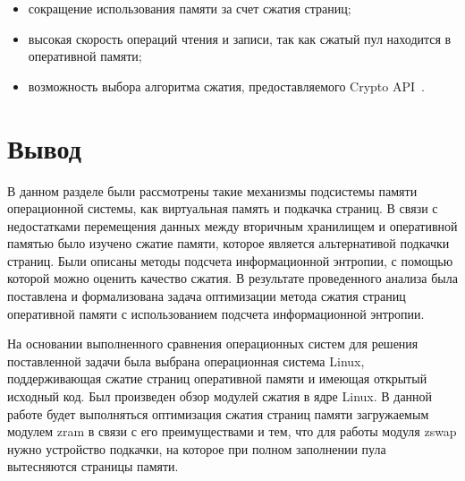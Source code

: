 \begin{itemize}
	\item сокращение использования памяти за счет сжатия страниц;
	\item высокая скорость операций чтения и записи, так как сжатый пул находится в оперативной памяти;
    \item возможность выбора алгоритма сжатия, предоставляемого Crypto API~\cite{crypto}.
\end{itemize}

\section*{Вывод}

В данном разделе были рассмотрены такие механизмы подсистемы памяти операционной системы, как виртуальная память и подкачка страниц. В связи с недостатками перемещения данных между вторичным хранилищем и оперативной памятью было изучено сжатие памяти, которое является альтернативой подкачки страниц. Были описаны методы подсчета информационной энтропии, с помощью которой можно оценить качество сжатия. В результате проведенного анализа была поставлена и формализована задача оптимизации метода сжатия страниц оперативной памяти с использованием подсчета информационной энтропии.

На основании выполненного сравнения операционных систем для решения поставленной задачи была выбрана операционная система Linux, поддерживающая сжатие страниц оперативной памяти и имеющая открытый исходный код. Был произведен обзор модулей сжатия в ядре Linux. В данной работе будет выполняться оптимизация сжатия страниц памяти загружаемым модулем zram в связи с его преимуществами и тем, что для работы модуля zswap нужно устройство подкачки, на которое при полном заполнении пула вытесняются страницы памяти.
